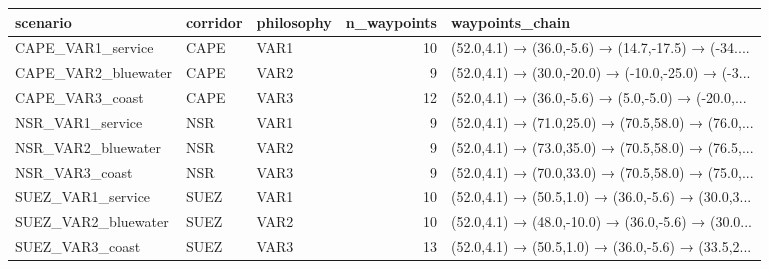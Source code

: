 \begin{tabular}{lllrl}
\toprule
           scenario & corridor & philosophy &  n\_waypoints &                                    waypoints\_chain \\
\midrule
  CAPE\_VAR1\_service &     CAPE &       VAR1 &           10 & (52.0,4.1) → (36.0,-5.6) → (14.7,-17.5) → (-34.... \\
CAPE\_VAR2\_bluewater &     CAPE &       VAR2 &            9 & (52.0,4.1) → (30.0,-20.0) → (-10.0,-25.0) → (-3... \\
    CAPE\_VAR3\_coast &     CAPE &       VAR3 &           12 & (52.0,4.1) → (36.0,-5.6) → (5.0,-5.0) → (-20.0,... \\
   NSR\_VAR1\_service &      NSR &       VAR1 &            9 & (52.0,4.1) → (71.0,25.0) → (70.5,58.0) → (76.0,... \\
 NSR\_VAR2\_bluewater &      NSR &       VAR2 &            9 & (52.0,4.1) → (73.0,35.0) → (70.5,58.0) → (76.5,... \\
     NSR\_VAR3\_coast &      NSR &       VAR3 &            9 & (52.0,4.1) → (70.0,33.0) → (70.5,58.0) → (75.0,... \\
  SUEZ\_VAR1\_service &     SUEZ &       VAR1 &           10 & (52.0,4.1) → (50.5,1.0) → (36.0,-5.6) → (30.0,3... \\
SUEZ\_VAR2\_bluewater &     SUEZ &       VAR2 &           10 & (52.0,4.1) → (48.0,-10.0) → (36.0,-5.6) → (30.0... \\
    SUEZ\_VAR3\_coast &     SUEZ &       VAR3 &           13 & (52.0,4.1) → (50.5,1.0) → (36.0,-5.6) → (33.5,2... \\
\bottomrule
\end{tabular}
